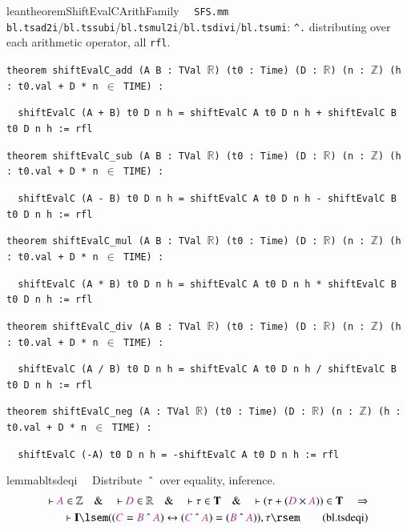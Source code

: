 \begin{restatable}{leantheorem}{ShiftEvalCArithFamily}~~ \texttt{SFS.mm} \texttt{bl.tsad2i}/\texttt{bl.tssubi}/\texttt{bl.tsmul2i}/\texttt{bl.tsdivi}/\texttt{bl.tsumi}: \texttt{\^{}.} distributing over each arithmetic operator, all \texttt{rfl}.

\texttt{\textcolor{leancolor}{theorem} \textcolor{leanyellow}{shiftEvalC\_add} (A B : TVal $\mathbb{R}$) (t0 : Time) (D : $\mathbb{R}$) (n : $\mathbb{Z}$) (h : t0.val + D * n $\in$ TIME) :}

\texttt{~~shiftEvalC (A + B) t0 D n h = shiftEvalC A t0 D n h + shiftEvalC B t0 D n h := rfl}

\texttt{\textcolor{leancolor}{theorem} \textcolor{leanyellow}{shiftEvalC\_sub} (A B : TVal $\mathbb{R}$) (t0 : Time) (D : $\mathbb{R}$) (n : $\mathbb{Z}$) (h : t0.val + D * n $\in$ TIME) :}

\texttt{~~shiftEvalC (A - B) t0 D n h = shiftEvalC A t0 D n h - shiftEvalC B t0 D n h := rfl}

\texttt{\textcolor{leancolor}{theorem} \textcolor{leanyellow}{shiftEvalC\_mul} (A B : TVal $\mathbb{R}$) (t0 : Time) (D : $\mathbb{R}$) (n : $\mathbb{Z}$) (h : t0.val + D * n $\in$ TIME) :}

\texttt{~~shiftEvalC (A * B) t0 D n h = shiftEvalC A t0 D n h * shiftEvalC B t0 D n h := rfl}

\texttt{\textcolor{leancolor}{theorem} \textcolor{leanyellow}{shiftEvalC\_div} (A B : TVal $\mathbb{R}$) (t0 : Time) (D : $\mathbb{R}$) (n : $\mathbb{Z}$) (h : t0.val + D * n $\in$ TIME) :}

\texttt{~~shiftEvalC (A / B) t0 D n h = shiftEvalC A t0 D n h / shiftEvalC B t0 D n h := rfl}

\texttt{\textcolor{leancolor}{theorem} \textcolor{leanyellow}{shiftEvalC\_neg} (A : TVal $\mathbb{R}$) (t0 : Time) (D : $\mathbb{R}$) (n : $\mathbb{Z}$) (h : t0.val + D * n $\in$ TIME) :}

\texttt{~~shiftEvalC (-A) t0 D n h = -shiftEvalC A t0 D n h := rfl}
\label{shiftEvalC_add}
\label{shiftEvalC_sub}
\label{shiftEvalC_mul}
\label{shiftEvalC_div}
\label{shiftEvalC_neg}
\end{restatable}

\begin{restatable}{lemma}{bltsdeqi}~~ Distribute $~\string^~$ over equality,
inference.
\begin{align}
\vdash \mc{A} \in \mathbb{Z}\quad\&\quad \vdash \mc{D} \in
    \mathbb{R}\quad\&\quad \vdash \tau \in \mathbf{T}\quad\&\quad \vdash ( \tau
    + ( \mc{D} \times \mc{A} ) ) \in \mathbf{T}\quad\Rightarrow \notag \\ %
     \quad \vdash
    \mathbf{I} \lsem ( ( \mc{C} = \mc{B} ~\string^~ \mc{A} ) \leftrightarrow (
    \mc{C} ~\string^~ \mc{A} ) = ( \mc{B} ~\string^~ \mc{A} ) ) , \tau
    \rsem\label{eq:bl.tsdeqi}\tag{bl.tsdeqi}
\end{align}
\end{restatable}

